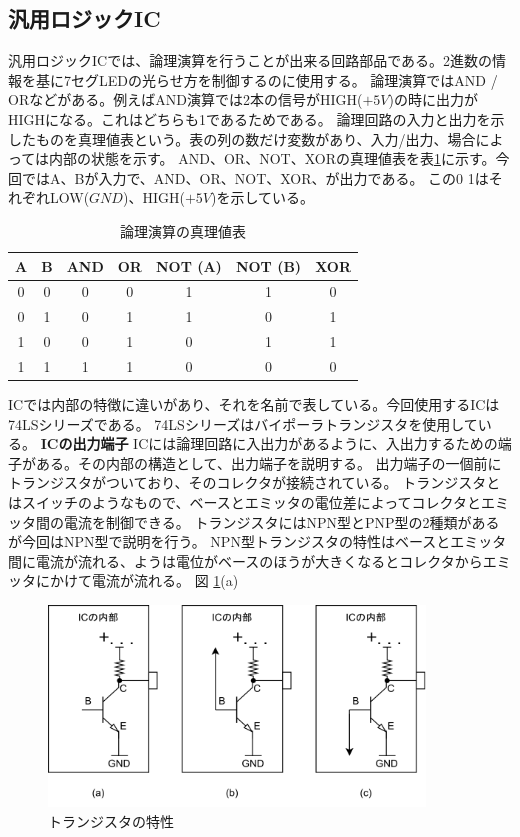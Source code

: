 \documentclass[a4paper,11pt]{jsarticle}
\begin{document}
\subsection{汎用ロジックIC}
汎用ロジックICでは、論理演算を行うことが出来る回路部品である。2進数の情報を基に7セグLEDの光らせ方を制御するのに使用する。
論理演算ではAND / ORなどがある。例えばAND演算では2本の信号がHIGH($+5V$)の時に出力がHIGHになる。これはどちらも1であるためである。
論理回路の入力と出力を示したものを真理値表という。表の列の数だけ変数があり、入力/出力、場合によっては内部の状態を示す。
AND、OR、NOT、XORの真理値表を表\ref{tab:logic}に示す。今回ではA、Bが入力で、AND、OR、NOT、XOR、が出力である。
この0 1はそれぞれLOW($GND$)、HIGH($+5V$)を示している。
\begin{table}[h]
  \centering
  \caption{論理演算の真理値表}
  \begin{tabular}{|c|c|c|c|c|c|c}
    \hline
    A & B & AND & OR & NOT (A) & NOT (B) & XOR \\
    \hline
    0 & 0 & 0 & 0 & 1 & 1 & 0 \\
    0 & 1 & 0 & 1 & 1 & 0 & 1 \\
    1 & 0 & 0 & 1 & 0 & 1 & 1 \\
    1 & 1 & 1 & 1 & 0 & 0 & 0 \\
    \hline
  \end{tabular}
  \label{tab:logic}
\end{table}
ICでは内部の特徴に違いがあり、それを名前で表している。今回使用するICは74LSシリーズである。
74LSシリーズはバイポーラトランジスタを使用している。
\textbf{ICの出力端子}
ICには論理回路に入出力があるように、入出力するための端子がある。その内部の構造として、出力端子を説明する。
出力端子の一個前にトランジスタがついており、そのコレクタが接続されている。
トランジスタとはスイッチのようなもので、ベースとエミッタの電位差によってコレクタとエミッタ間の電流を制御できる。
トランジスタにはNPN型とPNP型の2種類があるが今回はNPN型で説明を行う。
NPN型トランジスタの特性はベースとエミッタ間に電流が流れる、ようは電位がベースのほうが大きくなるとコレクタからエミッタにかけて電流が流れる。
図 \ref{fig:transistor}(a)
\begin{figure}[h]
  \centering
  \includegraphics[width=10cm]{./images/imag.png}
  \caption{トランジスタの特性}
  \label{fig:transistor}
\end{figure}
\end{document}
